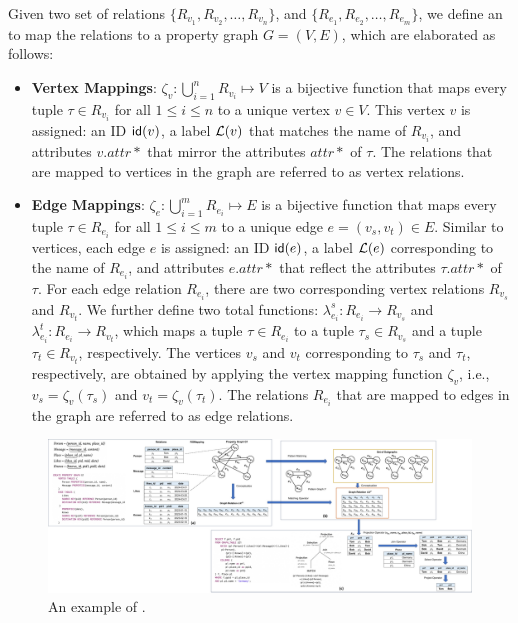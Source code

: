 \begin{definition}[\rgmapping]
\label{def:rgmapping}
Given two set of relations $\{R_{v_1}, R_{v_2}, \ldots, R_{v_n}\}$, and $\{R_{e_1}, R_{e_2}, \ldots, R_{e_m}\}$, we define an \rgmapping to map the relations to a property graph $G = (V, E)$, %
which are elaborated as follows:

\begin{itemize}
\item \textbf{Vertex Mappings}: $\zeta_v: \bigcup_{i=1}^{n} R_{v_i} \mapsto V$ is a bijective function that maps every tuple $\tau \in R_{v_i}$ for all $1 \leq i \leq n$ to a unique vertex $v \in V$. This vertex $v$ is assigned: an ID ${\mathsf{id}}(v)$, a label $\mathcal{L}(v)$ that matches the name of $R_{v_i}$, and attributes $v.attr*$ that mirror the attributes $attr*$ of $\tau$.
The relations that are mapped to vertices in the graph are referred to as vertex relations.

\item \textbf{Edge Mappings}: $\zeta_e: \bigcup_{i=1}^{m} R_{e_i} \mapsto E$ is a bijective function that maps every tuple $\tau \in R_{e_i}$ for all $1 \leq i \leq m$ to a unique edge $e = (v_s, v_t) \in E$. Similar to vertices, each edge $e$ is assigned: an ID ${\mathsf{id}}(e)$,
a label $\mathcal{L}(e)$ corresponding to the name of $R_{e_i}$, and attributes $e.attr*$ that reflect the attributes $\tau.attr*$ of $\tau$.
For each edge relation $R_{e_i}$, there are two corresponding vertex relations $R_{v_s}$ and $R_{v_t}$. We further define two total functions: $\lambda_{e_i}^s: R_{e_i} \to R_{v_s}$ and $\lambda_{e_i}^t: R_{e_i} \to R_{v_t}$, which maps a tuple $\tau \in R_{e_i}$ to a tuple $\tau_s \in R_{v_s}$ and a tuple $\tau_t \in R_{v_t}$, respectively.
The vertices $v_s$ and $v_t$ corresponding to $\tau_s$ and $\tau_t$, respectively, are obtained by applying the vertex mapping function $\zeta_v$, i.e., $v_s = \zeta_v(\tau_s)$ and $v_t = \zeta_v(\tau_t)$.
The relations $R_{e_i}$ that are mapped to edges in the graph are referred to as edge relations.
\end{itemize}
\end{definition}

\begin{figure}
    \centering
    \includegraphics[width=\linewidth]{./figures/rgmapping.pdf}
    \caption{An example of \rgmapping.}
    \label{fig:intro-rgmapping-example}
\end{figure}

